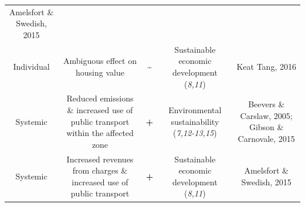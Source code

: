 \documentclass[
]{book}
\begin{document}
\begin{longtable}[]{@{}ccccc@{}}
\begin{minipage}[t]{0.17\columnwidth}
Amelsfort \& Swedish, 2015\strut
\end{minipage}\tabularnewline
\begin{minipage}[t]{0.17\columnwidth}\centering
Individual\strut
\end{minipage} & \begin{minipage}[t]{0.16\columnwidth}\centering
Ambiguous effect on housing value\strut
\end{minipage} & \begin{minipage}[t]{0.17\columnwidth}\centering
\textbf{\textasciitilde{}}\strut
\end{minipage} & \begin{minipage}[t]{0.17\columnwidth}\centering
Sustainable economic development (\emph{8,11})\strut
\end{minipage} & \begin{minipage}[t]{0.17\columnwidth}\centering
Keat Tang, 2016\strut
\end{minipage}\tabularnewline
\begin{minipage}[t]{0.17\columnwidth}\centering
Systemic\strut
\end{minipage} & \begin{minipage}[t]{0.16\columnwidth}\centering
Reduced emissions \& increased use of public transport within the affected zone\strut
\end{minipage} & \begin{minipage}[t]{0.17\columnwidth}\centering
\textbf{+}\strut
\end{minipage} & \begin{minipage}[t]{0.17\columnwidth}\centering
Environmental sustainability (\emph{7,12-13,15})\strut
\end{minipage} & \begin{minipage}[t]{0.17\columnwidth}\centering
Beevers \& Carslaw, 2005; Gibson \& Carnovale, 2015\strut
\end{minipage}\tabularnewline
\begin{minipage}[t]{0.17\columnwidth}\centering
Systemic\strut
\end{minipage} & \begin{minipage}[t]{0.16\columnwidth}\centering
Increased revenues from charges \& increased use of public transport\strut
\end{minipage} & \begin{minipage}[t]{0.17\columnwidth}\centering
\textbf{+}\strut
\end{minipage} & \begin{minipage}[t]{0.17\columnwidth}\centering
Sustainable economic development (\emph{8,11})\strut
\end{minipage} & \begin{minipage}[t]{0.17\columnwidth}\centering
Amelsfort \& Swedish, 2015\strut
\end{minipage}\tabularnewline
\bottomrule
\end{longtable}
\end{document}
